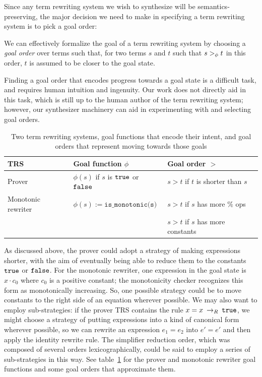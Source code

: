 Since any term rewriting system we wish to synthesize will be semantics-preserving, the major decision we need to make in specifying a term rewriting system is to pick a goal order:

\begin{assumption}
We can effectively formalize the goal of a term rewriting system by choosing a \emph{goal order} over terms such that, for two terms $s$ and $t$ such that $s >_{\phi} t$ in this order, $t$ is assumed to be closer to the goal state.
\end{assumption}

Finding a goal order that encodes progress towards a goal state is a difficult task, and requires human intuition and ingenuity. Our work does not directly aid in this task, which is still up to the human author of the term rewriting system; however, our synthesizer machinery can aid in experimenting with and selecting goal orders.

\begin{table}[]
    \centering
    \begin{tabular}{|l|l|l|}
    \hline 
        TRS & Goal function $\phi$ & Goal order $>$ \\
        \hline 
        Prover &  $\phi(s)$ if $s$ is $\texttt{true}$ or $\texttt{false}$ & $s > t$ if $t$ is shorter than $s$\\
        \hline
        Monotonic rewriter & $\phi(s) := \texttt{is_monotonic(s)}$ & $s > t$ if $s$ has more $\%$ ops \\
                 & & $s > t$ if $s$ has more constants \\
        \hline
    \end{tabular}
    \caption{Two term rewriting systems, goal functions that encode their intent, and goal orders that represent moving towards those goals}
    \label{tab:trsspecs}
\end{table}

As discussed above, the prover could adopt a strategy of making expressions shorter, with the aim of eventually being able to reduce them to the constants $\texttt{true}$ or $\texttt{false}$. For the monotonic rewriter, one expression in the goal state is $x \cdot c_0$ where $c_0$ is a positive constant; the monotonicity checker recognizes this form as monotonically increasing. So, one possible strategy could be to move constants to the right side of an equation wherever possible. We may also want to employ sub-strategies: if the prover TRS contains the rule $x = x \:\rightarrow_{R}\: \texttt{true}$, we might choose a strategy of putting expressions into a kind of canonical form wherever possible, so we can rewrite an expression $e_1 = e_2$ into $e' = e'$ and then apply the identity rewrite rule. The simplifier reduction order, which was composed of several orders lexicographically, could be said to employ a series of sub-strategies in this way. See table~\ref{tab:trsspecs} for the prover and monotonic rewriter goal functions and some goal orders that approximate them.

